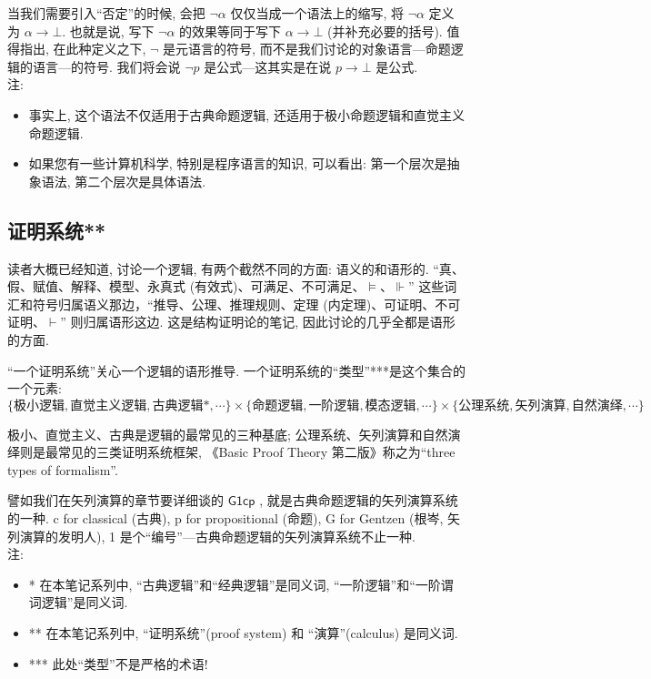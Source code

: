 \documentclass{article}
\def\a{\alpha}
\def\Gonecp{$ \mathsf{G1cp} $ }
\begin{document}
当我们需要引入``否定''的时候, 会把 $\neg \a$ 仅仅当成一个语法上的缩写, 将 $\neg \a$ 定义为 $\a \to \bot$. 也就是说, 写下 $\neg \a$ 的效果等同于写下 $\a \to \bot$ (并补充必要的括号). 值得指出, 在此种定义之下, $\neg$ 是元语言的符号, 而不是我们讨论的对象语言---命题逻辑的语言---的符号. 我们将会说 $\neg p$ 是公式---这其实是在说 $p \to \bot$ 是公式.\\

注: 
\begin{itemize}
	\item 事实上, 这个语法不仅适用于古典命题逻辑, 还适用于极小命题逻辑和直觉主义命题逻辑.
	\item 如果您有一些计算机科学, 特别是程序语言的知识, 可以看出: 第一个层次是抽象语法, 第二个层次是具体语法.
\end{itemize}


\subsection{证明系统**}

读者大概已经知道, 讨论一个逻辑, 有两个截然不同的方面: 语义的和语形的. ``真、假、赋值、解释、模型、永真式 (有效式)、可满足、不可满足、$\models$、$\Vdash$'' 这些词汇和符号归属语义那边，``推导、公理、推理规则、定理 (内定理)、可证明、不可证明、$\vdash$'' 则归属语形这边. 这是结构证明论的笔记, 因此讨论的几乎全都是语形的方面.

``一个证明系统''关心一个逻辑的语形推导. 一个证明系统的``类型''***是这个集合的一个元素:
$$
\{\text{极小逻辑}, \text{直觉主义逻辑}, \text{古典逻辑*}, \cdots\} \times \{\text{命题逻辑}, \text{一阶逻辑}, \text{模态逻辑}, \cdots\} \times \{\text{公理系统}, \text{矢列演算}, \text{自然演绎}, \cdots\}
$$

极小、直觉主义、古典是逻辑的最常见的三种基底; 公理系统、矢列演算和自然演绎则是最常见的三类证明系统框架, 《Basic Proof Theory 第二版》称之为``three types of formalism''.

譬如我们在矢列演算的章节要详细谈的 \Gonecp, 就是古典命题逻辑的矢列演算系统的一种. c for classical (古典), p for propositional (命题), G for Gentzen (根岑, 矢列演算的发明人), 1 是个``编号''---古典命题逻辑的矢列演算系统不止一种.\\

注:
\begin{itemize}
	\item * 在本笔记系列中, ``古典逻辑''和``经典逻辑''是同义词, ``一阶逻辑''和``一阶谓词逻辑''是同义词.
	\item ** 在本笔记系列中, ``证明系统''(proof system) 和 ``演算''(calculus) 是同义词.
	\item *** 此处``类型''不是严格的术语!
\end{itemize}
\end{document}
